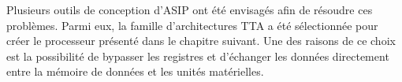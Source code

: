 Plusieurs outils de conception d'ASIP ont été envisagés afin de résoudre ces problèmes. Parmi eux, la famille d'architectures \og TTA \fg a été sélectionnée pour créer le processeur présenté dans le chapitre suivant. Une des raisons de ce choix est la possibilité de bypasser les registres et d'échanger les données directement entre la mémoire de données et les unités matérielles.